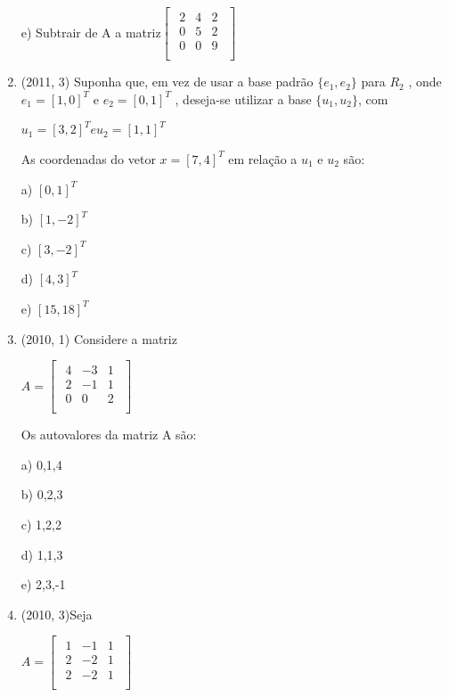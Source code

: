 \documentclass{article}
\begin{document}
\begin{enumerate}
e) Subtrair de A a matriz$\left [ \begin{matrix} 
    \begin{array}{ccc}
    2 & 4 & 2  \\
    0 & 5 & 2  \\
    0 & 0 & 9  \\
\end{array}
\end{matrix} \right ]$ \newline





\item(2011, 3) Suponha que, em vez de usar a base padrão $\{e_1 , e_2 \}$ para $R_2$ , onde $e_1 = [1, 0]^T$ e $e_2 = [0, 1]^T$ , deseja-se utilizar a base $\{u_1 , u_2 \}$, com 

$u_1 = [3, 2]^T e u_2 = [1, 1]^T$ 

As coordenadas do vetor $x = [7, 4]^T$ em relação a $u_1$ e $u_2$ são:

a) $[0, 1]^T$

b) $[1, -2]^T$

c) $[3, -2]^T$

d) $[4, 3]^T$

e) $[15, 18]^T$ \newline








\item(2010, 1) Considere a matriz

$
A = \left [ \begin{matrix} 
    \begin{array}{cccc}
    4 & -3 & 1  \\
    2 & -1 & 1  \\
    0 & 0 & 2  \\
\end{array}
\end{matrix} \right ]$ \newline 

Os autovalores da matriz A são:

a) 0,1,4

b) 0,2,3

c) 1,2,2

d) 1,1,3

e) 2,3,-1


\item(2010, 3)Seja


$
A = \left [ \begin{matrix} 
    \begin{array}{cccc}
    1 & -1 & 1  \\
    2 & -2 & 1  \\
    2 & -2 & 1  \\
\end{array}
\end{matrix} \right ]$ \newline 


\end{enumerate}
\end{document}
